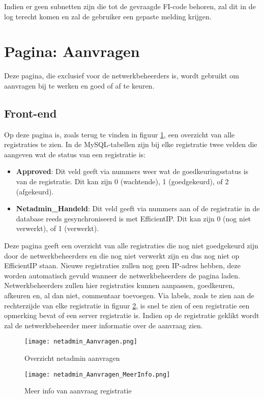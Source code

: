 Indien er geen subnetten zijn die tot de gevraagde FI-code behoren, zal dit in de log terecht komen en zal de gebruiker een gepaste melding krijgen.

\section{Pagina: Aanvragen}
\label{aanvragen}
Deze pagina, die exclusief voor de netwerkbeheerders is, wordt gebruikt om aanvragen bij te werken en goed of af te keuren.

\subsection{Front-end}
Op deze pagina is, zoals terug te vinden in figuur \ref{fig:netadmin_Aanvragen}, een overzicht van alle registraties te zien. In de MySQL-tabellen zijn bij elke registratie twee velden die aangeven wat de status van een registratie is:
\begin{itemize}
    \item \textbf{Approved}: Dit veld geeft via nummers weer wat de goedkeuringsstatus is van de registratie. Dit kan zijn 0 (wachtende), 1 (goedgekeurd), of 2 (afgekeurd).
    \item \textbf{Netadmin\_Handeld}: Dit veld geeft via nummers aan of de registratie in de database reeds gesynchroniseerd is met EfficientIP. Dit kan zijn 0 (nog niet verwerkt), of 1 (verwerkt).
\end{itemize} 
Deze pagina geeft een overzicht van alle registraties die nog niet goedgekeurd zijn door de netwerkbeheerders en die nog niet verwerkt zijn en dus nog niet op EfficientIP staan. Nieuwe registraties zullen nog geen IP-adres hebben, deze worden automatisch gevuld wanneer de netwerkbeheerders de pagina laden.
Netwerkbeheerders zullen hier registraties kunnen aanpassen, goedkeuren, afkeuren en, al dan niet, commentaar toevoegen. Via labels, zoals te zien aan de rechterzijde van elke registratie in figuur \ref{fig:netadmin_Aanvragen_MeerInfo}, is snel te zien of een registratie een opmerking bevat of een server registratie is. Indien op de registratie geklikt wordt zal de netwerkbeheerder meer informatie over de aanvraag zien.
\begin{figure}[H]
    \texttt{[image: netadmin\_Aanvragen.png]}
    \caption{Overzicht netadmin aanvragen}
    \label{fig:netadmin_Aanvragen}
\end{figure}
\begin{figure}[H]
    \texttt{[image: netadmin\_Aanvragen\_MeerInfo.png]}
    \caption{Meer info van aanvraag registratie}
    \label{fig:netadmin_Aanvragen_MeerInfo}
\end{figure}
